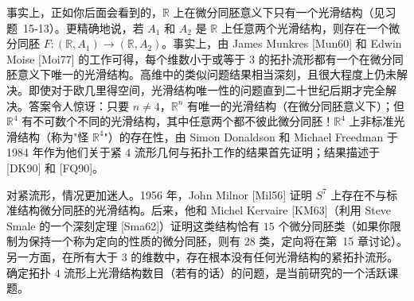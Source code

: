 \documentclass[../../main.tex]{subfiles}
\begin{document}
事实上，正如你后面会看到的，$\mathbb{R}$ 上在微分同胚意义下只有一个光滑结构（见习题~15-13）。更精确地说，若 $A_{1}$ 和 $A_{2}$ 是 $\mathbb{R}$ 上任意两个光滑结构，则存在一个微分同胚 $F:(\mathbb{R},A_{1})\to(\mathbb{R},A_{2})$。事实上，由 James Munkres [Mun60] 和 Edwin Moise [Moi77] 的工作可得，每个维数小于或等于 $3$ 的拓扑流形都有一个在微分同胚意义下唯一的光滑结构。高维中的类似问题结果相当深刻，且很大程度上仍未解决。即使对于欧几里得空间，光滑结构唯一性的问题直到二十世纪后期才完全解决。答案令人惊讶：只要 $n\neq 4$，$\mathbb{R}^{n}$ 有唯一的光滑结构（在微分同胚意义下）；但 $\mathbb{R}^{4}$ 有不可数个不同的光滑结构，其中任意两个都不彼此微分同胚！$\mathbb{R}^{4}$ 上非标准光滑结构（称为"怪 $\mathbb{R}^{4}$"）的存在性，由 Simon Donaldson 和 Michael Freedman 于 1984 年作为他们关于紧 $4$ 流形几何与拓扑工作的结果首先证明；结果描述于 [DK90] 和 [FQ90]。

对紧流形，情况更加迷人。1956 年，John Milnor [Mil56] 证明 $S^{7}$ 上存在不与标准结构微分同胚的光滑结构。后来，他和 Michel Kervaire [KM63]（利用 Steve Smale 的一个深刻定理 [Sma62]）证明这类结构恰有 $15$ 个微分同胚类（如果你限制为保持一个称为定向的性质的微分同胚，则有 $28$ 类，定向将在第~15 章讨论）。另一方面，在所有大于 $3$ 的维数中，存在根本没有任何光滑结构的紧拓扑流形。确定拓扑 $4$ 流形上光滑结构数目（若有的话）的问题，是当前研究的一个活跃课题。
\end{document}
